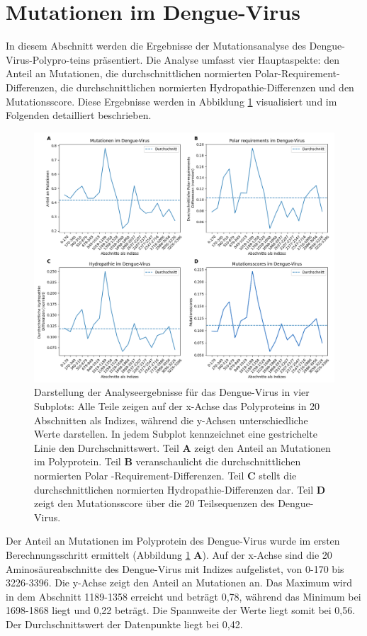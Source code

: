 \documentclass[german,version-2022-01]{uzl-thesis}
\begin{document}
\section{Mutationen im Dengue-Virus}
In diesem Abschnitt werden die Ergebnisse der Mutationsanalyse des Dengue-Virus-Polypro-teins pr\"asentiert. Die Analyse umfasst vier Hauptaspekte: den Anteil an Mutationen, die durchschnittlichen normierten Polar-Requirement-Differenzen, die durchschnittlichen normierten Hydropathie-Differenzen und den Mutationsscore. Diese Ergebnisse werden in Abbildung \ref{fig:Dengue_virus_combined} visualisiert und im Folgenden detailliert beschrieben.
\begin{figure}[tbp]
  \centering
  \includegraphics[scale=0.36]{Images/Diagramm_combined_pictures_Dengue_virus.png}
  \caption{Darstellung der Analyseergebnisse f\"ur das Dengue-Virus in vier Subplots: Alle Teile zeigen auf der x-Achse das Polyproteins in 20 Abschnitten als Indizes, w\"ahrend die y-Achsen unterschiedliche Werte darstellen. In jedem Subplot kennzeichnet eine gestrichelte Linie den Durchschnittswert. Teil \textbf{A} zeigt den Anteil an Mutationen im Polyprotein. Teil \textbf{B} veranschaulicht die durchschnittlichen normierten Polar
  -Requirement-Differenzen. Teil \textbf{C} stellt die durchschnittlichen normierten Hydropathie-Differenzen dar. Teil \textbf{D} zeigt den Mutationsscore \"uber die 20 Teilsequenzen des Dengue-Virus.}
  \label{fig:Dengue_virus_combined}
\end{figure}

Der Anteil an Mutationen im Polyprotein des Dengue-Virus wurde im ersten Berechnungsschritt ermittelt (Abbildung \ref{fig:Dengue_virus_combined} \textbf{A}). Auf der x-Achse sind die 20 Aminos\"aureabschnitte des Dengue-Virus mit Indizes aufgelistet, von 0-170 bis 3226-3396. Die y-Achse zeigt den Anteil an Mutationen an. Das Maximum wird in dem Abschnitt 1189-1358 erreicht und betr\"agt 0,78, w\"ahrend das Minimum bei 1698-1868 liegt und 0,22 betr\"agt. Die Spannweite der Werte liegt somit bei 0,56. Der Durchschnittswert der Datenpunkte liegt bei 0,42. 
\end{document}
